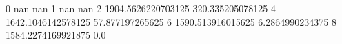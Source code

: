0 nan nan
1 nan nan
2 1904.5626220703125 320.335205078125
4 1642.1046142578125 57.877197265625
6 1590.513916015625 6.2864990234375
8 1584.2274169921875 0.0
